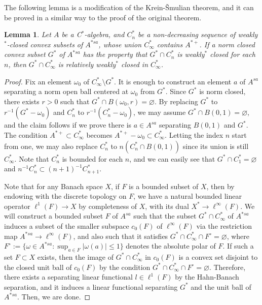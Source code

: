 \documentclass[a4paper]{amsart}
\theoremstyle{plain}
\newtheorem{lem}[thm]{Lemma}
\theoremstyle{definition}
\begin{document}
The following lemma is a modification of the Krein-\v Smulian theorem, and it can be proved in a similar way to the proof of the original theorem.

\begin{lem}\label{krein-smulian}
Let $A$ be a C$^*$-algebra, and $C^*_n$ be a non-decreasing sequence of weakly$^*$-closed convex subsets of $A^{*sa}$, whose union $C_\infty^*$ contains $A^{*+}$.
If a norm closed convex subset $G^*$ of $A^{*sa}$ has the property that $G^*\cap C^*_n$ is weakly$^*$ closed for each $n$, then $G^*\cap C_\infty^*$ is relatively weakly$^*$ closed in $C_\infty^*$.
\end{lem}
\begin{proof}
Fix an element $\omega_0$ of $C_\infty^*\setminus G^*$.
It is enough to construct an element $a$ of $A^{sa}$ separating a norm open ball centered at $\omega_0$ from $G^*$.
Since $G^*$ is norm closed, there exists $r>0$ such that $G^*\cap B(\omega_0,r)=\varnothing$.
By replacing $G^*$ to $r^{-1}(G^*-\omega_0)$ and $C_n^*$ to $r^{-1}(C_n^*-\omega_0)$, we may assume $G^*\cap B(0,1)=\varnothing$, and the claim follows if we prove there is $a\in A^{sa}$ separating $B(0,1)$ and $G^*$.
The condition $A^{*+}\subset C_\infty^*$ becomes $A^{*+}-\omega_0\subset C_\infty^*$.
Letting the index $n$ start from one, we may also replace $C_n^*$ to $n(C_n^*\cap B(0,1))$ since its union is still $C_\infty^*$.
Note that $C_n^*$ is bounded for each $n$, and we can easily see that $G^*\cap C_1^*=\varnothing$ and $n^{-1}C_n^*\subset(n+1)^{-1}C_{n+1}^*$.

Note that for any Banach space $X$, if $F$ is a bounded subset of $X$, then by endowing with the discrete topology on $F$, we have a natural bounded linear operator $\ell^1(F)\to X$ by completeness of $X$, with its dual $X^*\to\ell^\infty(F)$.
We will construct a bounded subset $F$ of $A^{sa}$ such that the subset $G^*\cap C_\infty^*$ of $A^{*sa}$ induces a subset of the smaller subspace $c_0(F)$ of $\ell^\infty(F)$ via the restriction map $A^{*sa}\to\ell^\infty(F)$, and also such that it satisfies $G^*\cap C_\infty^*\cap F^\circ=\varnothing$, where $F^\circ:=\{\omega\in A^{*sa}:\sup_{a\in F}|\omega(a)|\le1\}$ denotes the absolute polar of $F$.
If such a set $F\subset X$ exists, then the image of $G^*\cap C_\infty^*$ in $c_0(F)$ is a convex set disjoint to the closed unit ball of $c_0(F)$ by the condition $G^*\cap C_\infty^*\cap F^\circ=\varnothing$.
Therefore, there exists a separating linear functional $l\in\ell^1(F)$ by the Hahn-Banach separation, and it induces a linear functional separating $G^*$ and the unit ball of $A^{*sa}$.
Then, we are done.


\end{proof}
\end{document}
